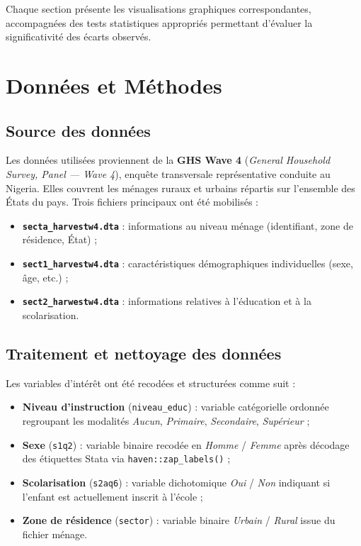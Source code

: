 \documentclass[
  11pt,
]{article}
\providecommand{\tightlist}{%
  \setlength{\itemsep}{0pt}\setlength{\parskip}{0pt}}
\begin{document}
Chaque section présente les visualisations graphiques correspondantes,
accompagnées des tests statistiques appropriés permettant d'évaluer la
significativité des écarts observés.

\section{Données et Méthodes}\label{donnuxe9es-et-muxe9thodes}

\subsection{Source des données}\label{source-des-donnuxe9es}

Les données utilisées proviennent de la \textbf{GHS Wave 4}
(\emph{General Household Survey, Panel --- Wave 4}), enquête
transversale représentative conduite au Nigeria. Elles couvrent les
ménages ruraux et urbains répartis sur l'ensemble des États du pays.
Trois fichiers principaux ont été mobilisés :

\begin{itemize}
\tightlist
\item
  \textbf{\texttt{secta\_harvestw4.dta}} : informations au niveau ménage
  (identifiant, zone de résidence, État) ;
\item
  \textbf{\texttt{sect1\_harvestw4.dta}} : caractéristiques
  démographiques individuelles (sexe, âge, etc.) ;
\item
  \textbf{\texttt{sect2\_harwestw4.dta}} : informations relatives à
  l'éducation et à la scolarisation.
\end{itemize}

\subsection{Traitement et nettoyage des
données}\label{traitement-et-nettoyage-des-donnuxe9es}

Les variables d'intérêt ont été recodées et structurées comme suit :

\begin{itemize}
\tightlist
\item
  \textbf{Niveau d'instruction} (\texttt{niveau\_educ}) : variable
  catégorielle ordonnée regroupant les modalités \emph{Aucun},
  \emph{Primaire}, \emph{Secondaire}, \emph{Supérieur} ;
\item
  \textbf{Sexe} (\texttt{s1q2}) : variable binaire recodée en
  \emph{Homme} / \emph{Femme} après décodage des étiquettes Stata via
  \texttt{haven::zap\_labels()} ;
\item
  \textbf{Scolarisation} (\texttt{s2aq6}) : variable dichotomique
  \emph{Oui} / \emph{Non} indiquant si l'enfant est actuellement inscrit
  à l'école ;
\item
  \textbf{Zone de résidence} (\texttt{sector}) : variable binaire
  \emph{Urbain} / \emph{Rural} issue du fichier ménage.
\end{itemize}
\end{document}
